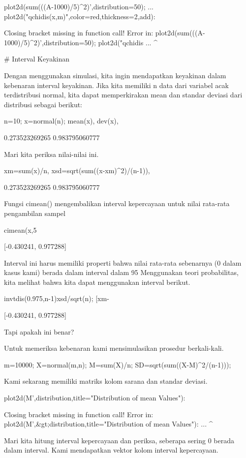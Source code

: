 \documentclass{article}
\begin{document}
\>plot2d(sum(((A-1000)/5)^2)’,distribution=50); ...  
\>    plot2d("qchidis(x,m)",color=red,thickness=2,\>add):


    Closing bracket missing in function call!
    Error in:
    plot2d(sum(((A-1000)/5)^2)’,distribution=50);  plot2d("qchidis ...
                              ^

# Interval Keyakinan 

Dengan menggunakan simulasi, kita ingin mendapatkan keyakinan dalam
kebenaran interval keyakinan. Jika kita memiliki n data dari variabel
acak terdistribusi normal, kita dapat memperkirakan mean dan standar
deviasi dari distribusi sebagai berikut:


\>n=10; x=normal(n); mean(x), dev(x),


    0.273523269265
    0.983795060777

Mari kita periksa nilai-nilai ini.


\>xm=sum(x)/n, xsd=sqrt(sum((x-xm)^2)/(n-1)),


    0.273523269265
    0.983795060777

Fungsi cimean() mengembalikan interval kepercayaan untuk nilai
rata-rata pengambilan sampel


\>cimean(x,5%


    [-0.430241,  0.977288]

Interval ini harus memiliki properti bahwa nilai rata-rata sebenarnya
(0 dalam kasus kami) berada dalam interval dalam 95%
Menggunakan teori probabilitas, kita melihat bahwa kita dapat
menggunakan interval berikut.


\>invtdis(0.975,n-1)\*xsd/sqrt(n); [xm-%


    [-0.430241,  0.977288]

Tapi apakah ini benar?


Untuk memeriksa kebenaran kami mensimulasikan prosedur berkali-kali.


\>m=10000; X=normal(m,n); M=sum(X)/n; SD=sqrt(sum((X-M)^2/(n-1)));


Kami sekarang memiliki matriks kolom sarana dan standar deviasi.


\>plot2d(M’,\>distribution,title="Distribution of mean Values"):


    Closing bracket missing in function call!
    Error in:
    plot2d(M’,&gt;distribution,title="Distribution of mean Values"): ...
            ^

Mari kita hitung interval kepercayaan dan periksa, seberapa sering 0
berada dalam interval. Kami mendapatkan vektor kolom interval
kepercayaan.
\end{document}

